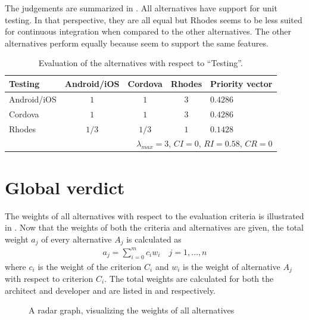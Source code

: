 The judgements are summarized in . All alternatives have support for unit testing. In that perspective, they are all equal but Rhodes seems to be less suited for continuous integration when compared to the other alternatives. The other alternatives perform equally because seem to support the same features.

\begin{table}[h!]
    \centering
    \begin{tabular}{lcccl}
        \hline
        \textbf{Testing} & Android/iOS & Cordova & Rhodes & Priority vector \\
        \hline
        Android/iOS      & $1$         & $1$     & $3$    & $0.4286$ \\
        Cordova          & $1$         & $1$     & $3$    & $0.4286$ \\
        Rhodes           & $1/3$       & $1/3$   & $1$    & $0.1428$ \\
        \hline
        \multicolumn{5}{r}{$\lambda_{max} = 3$, $CI = 0$, $RI = 0.58$, $CR = 0$}\\
        \hline
    \end{tabular}
    \caption{Evaluation of the alternatives with respect to ``Testing''.}
    \label{tab:testing}
\end{table}

\section{Global verdict}

The weights of all alternatives with respect to the evaluation criteria is illustrated in . Now that the weights of both the criteria and alternatives are given, the total weight $a_j$ of every alternative $A_j$ is calculated as
\begin{gather*}
    a_j = \sum_{i = 0}^{m} c_i w_i \quad j = 1, \ldots, n
\end{gather*}
where $c_i$ is the weight of the criterion $C_i$ and $w_i$ is the weight of alternative $A_j$ with respect to criterion $C_i$. The total weights are calculated for both the architect and developer and are listed in  and  respectively. 

\begin{figure}
    \centering
    \caption{A radar graph, visualizing the weights of all alternatives}
    \label{fig:radar}
\end{figure}

